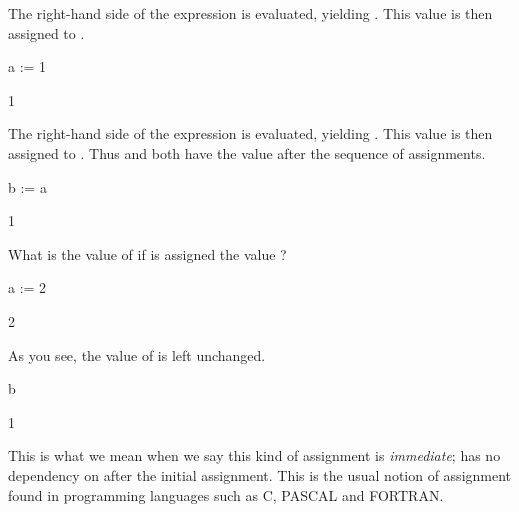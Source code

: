 {\begin{xtc}
\begin{xtccomment}
The right-hand side of the expression is evaluated,
yielding .  This value is then assigned to .
\end{xtccomment}
\begin{spadsrc}
a := 1 
\end{spadsrc}
\begin{TeXOutput}
\begin{fricasmath}{1}
1%
\end{fricasmath}
\end{TeXOutput}
\end{xtc}
\begin{xtc}
\begin{xtccomment}
The right-hand side of the expression is evaluated,
yielding .  This value is then assigned to .
Thus  and  both have the value  after the sequence
of assignments.
\end{xtccomment}
\begin{spadsrc}
b := a 
\end{spadsrc}
\begin{TeXOutput}
\begin{fricasmath}{2}
1%
\end{fricasmath}
\end{TeXOutput}
\end{xtc}
\begin{xtc}
\begin{xtccomment}
What is the value of  if  is
assigned the value ?
\end{xtccomment}
\begin{spadsrc}
a := 2 
\end{spadsrc}
\begin{TeXOutput}
\begin{fricasmath}{3}
2%
\end{fricasmath}
\end{TeXOutput}
\end{xtc}
\begin{xtc}
\begin{xtccomment}
As you see, the value of  is left unchanged.
\end{xtccomment}
\begin{spadsrc}
b 
\end{spadsrc}
\begin{TeXOutput}
\begin{fricasmath}{4}
1%
\end{fricasmath}
\end{TeXOutput}
\end{xtc}
This is what we mean when we say this kind of assignment is
{\it immediate};
 has no dependency on  after the initial assignment.
This is the usual notion of assignment found in programming
languages such as C,
PASCAL
and FORTRAN.

}
